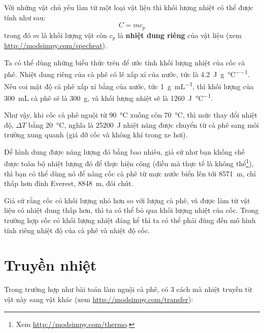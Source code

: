 \documentclass[12pt]{book}
\theoremstyle{exercise}
\begin{document}

Với những vật chủ yếu làm từ một loại vật liệu thì khối lượng nhiệt có thể được tính như sau:
%
\[ C = m c_p \]
%
trong đó $m$ là khối lượng vật còn $c_p$ là {\bf nhiệt dung riêng} của vật liệu (xem \url{http://modsimpy.com/specheat}).


Ta có thể dùng những biểu thức trên để ước tính khối lượng nhiệt của cốc cà phê. Nhiệt dung riêng của cà phê có lẽ xấp xỉ của nước, tức là \SI{4.2}{\joule\per\gram\per\celsius}.  Nếu coi mật độ cà phê xấp xỉ bằng của nước, tức \SI{1}{\gram\per\milli\liter}, thì khối lượng của \SI{300}{\milli\liter} cà phê sẽ là \SI{300}{\gram}, và khối lượng nhiệt sẽ là \SI{1260}{\joule\per\celsius}.


Như vậy, khi cốc cà phê nguội từ \SI{90}{\celsius} xuống còn \SI{70}{\celsius}, thì mức thay đổi nhiệt độ, $\Delta T$ bằng \SI{20}{\celsius}, nghĩa là \SI{25200}{\joule} nhiệt năng được chuyển từ cà phê sang môi trường xung quanh (giá đỡ cốc và không khí trong xe hơi).

Để hình dung được năng lượng đó bằng bao nhiêu, giả sử như bạn khống chế được toàn bộ nhiệt lượng đó để thực hiện công (điều mà thực tế là không thể\footnote{Xem \url{http://modsimpy.com/thermo}.}), thì bạn có thể dùng nó để nâng cốc cà phê từ mực nước biển lên tới \SI{8571}{\meter}, chỉ thấp hơn đỉnh Everest, \SI{8848}{\meter}, đôi chút.


Giả sử rằng cốc có khối lượng nhỏ hơn so với lượng cà phê, và được làm từ vật liệu có nhiệt dung thấp hơn, thì ta có thể bỏ qua khối lượng nhiệt của cốc. Trong trường hợp cốc có khối lượng nhiệt đáng kể thì ta có thể phải đùng đến mô hình tính riêng nhiệt độ của cà phê và nhiệt độ cốc.


\section{Truyền nhiệt}

Trong trường hợp như bài toán làm nguội cà phê, có 3 cách mà nhiệt truyền từ vật này sang vật khác (xem \url{http://modsimpy.com/transfer}):

\end{document}
